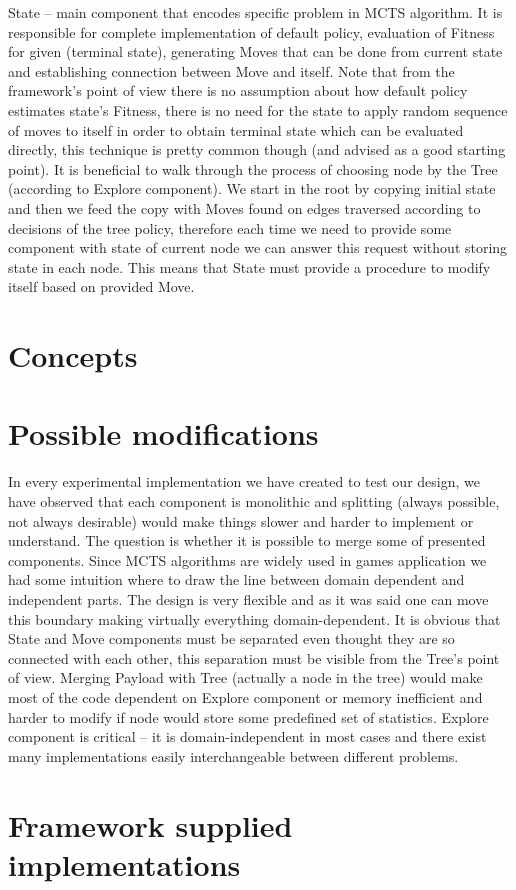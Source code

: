 State -- main component that encodes specific problem in MCTS algorithm.
It is responsible for complete implementation of default policy, evaluation of
Fitness for given (terminal state), generating Moves that can be done from
current state and establishing connection between Move and itself.
Note that from the framework's point of view there is no assumption about how
default policy estimates state's Fitness, there is no need for the state to
apply random sequence of moves to itself in order to obtain terminal state
which can be evaluated directly, this technique is pretty common though (and
advised as a good starting point).
It is beneficial to walk through the process of choosing node by the Tree
(according to Explore component). We start in the root by copying initial
state and then we feed the copy with Moves found on edges traversed
according to decisions of the tree policy, therefore each time we need to
provide some component with state of current node we can answer this request
without storing state in each node. This means that State must provide a
procedure to modify itself based on provided Move.

\section{Concepts}

\section{Possible modifications}
In every experimental implementation we have created to test our design, we
have observed that each component is monolithic and splitting (always possible,
not always desirable) would make things slower and harder to implement or
understand.
The question is whether it is possible to merge some of presented components.
Since MCTS algorithms are widely used in games application we had some
intuition where to draw the line between domain dependent and independent
parts. The design is very flexible and as it was said one can move this
boundary making virtually everything domain-dependent. It is obvious that State
and Move components must be separated even thought they are so connected with
each other, this separation must be visible from the Tree's point of view.
Merging Payload with Tree (actually a node in the tree) would make most of the
code dependent on Explore component or memory inefficient and harder to modify
if node would store some predefined set of statistics.
Explore component is critical -- it is domain-independent in most cases and
there exist many implementations easily interchangeable between different
problems.

\section{Framework supplied implementations}

